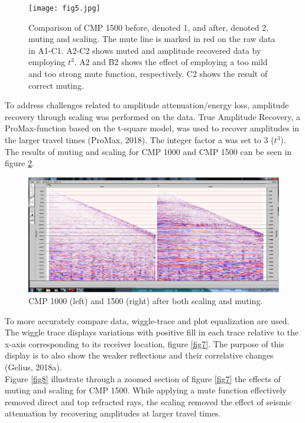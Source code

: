 \documentclass[10pt,a4paper]{article}
\begin{document}
\begin{figure}[H]
\texttt{[image: fig5.jpg]}
\caption{Comparison of CMP 1500 before, denoted 1, and after, denoted 2, muting and scaling. The mute line is marked in red on the raw data in A1-C1. A2-C2 shows muted and amplitude recovered data by employing $t^3$. A2 and B2 shows the effect of employing a too mild and too strong mute function, respectively. C2 shows the result of correct muting.}
\label{fig5}
\end{figure}


\noindent To address challenges related to amplitude attenuation/energy loss, amplitude recovery through scaling was performed on the data. True Amplitude Recovery, a ProMax-function based on the t-square model, was used to recover amplitudes in the larger travel times (ProMax, 2018). The integer factor a was set to 3 ($t^3$). The results of muting and scaling for CMP 1000 and CMP 1500 can be seen in figure \ref{fig6}.  

\begin{figure}[H]
\includegraphics[width=\textwidth, trim={0.7cm 0.8cm 0.2cm 0.5cm},clip]{fig6.jpg}
\caption{CMP 1000 (left) and 1500 (right) after both scaling and muting.}
\label{fig6}
\end{figure}

\noindent To more accurately compare data, wiggle-trace and plot equalization are used. The wiggle trace displays variations with positive fill in each trace relative to the x-axis corresponding to its receiver location, figure \ref{fig7}. 
The purpose of this display is to also show the weaker reflections and their correlative changes (Gelius, 2018a). 
\\
Figure \ref{fig8} illustrate through a zoomed section of figure \ref{fig7} the effects of muting and scaling for CMP 1500. While applying a mute function effectively removed direct and top refracted rays, the scaling removed the effect of seismic attenuation by recovering amplitudes at larger travel times. 
\end{document}
